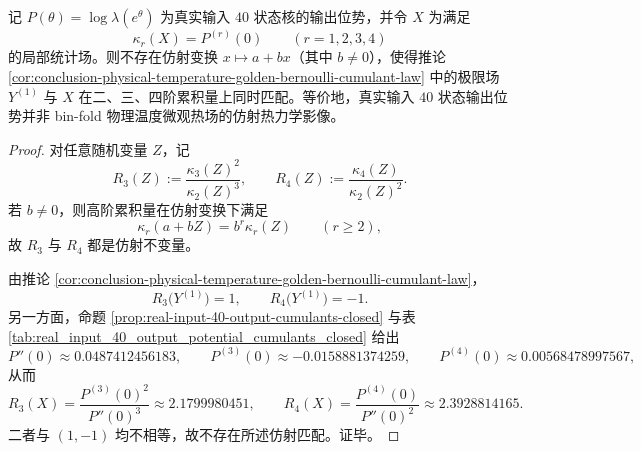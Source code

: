 \begin{theorem}\label{thm:conclusion-binfold-realinput40-affine-cumulant-obstruction}
记 \(P(\theta)=\log\lambda(e^\theta)\) 为真实输入 \(40\) 状态核的输出位势，并令 \(X\) 为满足
\[
\kappa_r(X)=P^{(r)}(0)
\qquad (r=1,2,3,4)
\]
的局部统计场。则不存在仿射变换 \(x\mapsto a+bx\)（其中 \(b\neq 0\)），使得推论 \ref{cor:conclusion-physical-temperature-golden-bernoulli-cumulant-law} 中的极限场 \(Y^{(1)}\) 与 \(X\) 在二、三、四阶累积量上同时匹配。等价地，真实输入 \(40\) 状态输出位势并非 bin-fold 物理温度微观热场的仿射热力学影像。
\end{theorem}
\begin{proof}
对任意随机变量 \(Z\)，记
\[
R_3(Z):=\frac{\kappa_3(Z)^2}{\kappa_2(Z)^3},
\qquad
R_4(Z):=\frac{\kappa_4(Z)}{\kappa_2(Z)^2}.
\]
若 \(b\neq 0\)，则高阶累积量在仿射变换下满足
\[
\kappa_r(a+bZ)=b^r\kappa_r(Z)
\qquad (r\ge 2),
\]
故 \(R_3\) 与 \(R_4\) 都是仿射不变量。

由推论 \ref{cor:conclusion-physical-temperature-golden-bernoulli-cumulant-law}，
\[
R_3\!\bigl(Y^{(1)}\bigr)=1,
\qquad
R_4\!\bigl(Y^{(1)}\bigr)=-1.
\]
另一方面，命题 \ref{prop:real-input-40-output-cumulants-closed} 与表 \ref{tab:real_input_40_output_potential_cumulants_closed} 给出
\[
P''(0)\approx 0.0487412456183,
\qquad
P^{(3)}(0)\approx -0.0158881374259,
\qquad
P^{(4)}(0)\approx 0.00568478997567,
\]
从而
\[
R_3(X)=\frac{P^{(3)}(0)^2}{P''(0)^3}\approx 2.1799980451,
\qquad
R_4(X)=\frac{P^{(4)}(0)}{P''(0)^2}\approx 2.3928814165.
\]
二者与 \((1,-1)\) 均不相等，故不存在所述仿射匹配。证毕。
\end{proof}

